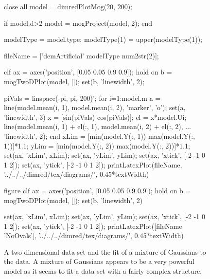 % 
\begin{figure}
  \begin{matlab}
    close all
    model = dimredPlotMog(20, 200);
    
    if model.d>2
      model = mogProject(model, 2);
    end
    
    modelType = model.type;
    modelType(1) = upper(modelType(1));


    fileName = ['demArtificial' modelType num2str(2)];
    
    clf
    ax = axes('position', [0.05 0.05 0.9 0.9]);
    hold on
    b = mogTwoDPlot(model, []);
    set(b, 'linewidth', 2);
    

    piVals = linspace(-pi, pi, 200)';
    for i=1:model.m
      a = line(model.mean(i, 1), model.mean(i, 2), 'marker', 'o');
      set(a, 'linewidth', 3)
      x = [sin(piVals) cos(piVals)];
      el = x*model.U{i};
      line(model.mean(i, 1) + el(:, 1), model.mean(i, 2) + el(:, 2), ...
      'linewidth', 2);
    end
    xLim = [min(model.Y(:, 1)) max(model.Y(:, 1))]*1.1;
    yLim = [min(model.Y(:, 2)) max(model.Y(:, 2))]*1.1;
    set(ax, 'xLim', xLim);
    set(ax, 'yLim', yLim);
    set(ax, 'xtick', [-2 -1 0 1 2]);
    set(ax, 'ytick', [-2 -1 0 1 2]);
    printLatexPlot(fileName, '../../../dimred/tex/diagrams/', 0.45*textWidth)
    
    figure
    clf
    ax = axes('position', [0.05 0.05 0.9 0.9]);
    hold on
    b = mogTwoDPlot(model, []);
    set(b, 'linewidth', 2)
    
    set(ax, 'xLim', xLim);
    set(ax, 'yLim', yLim);
    set(ax, 'xtick', [-2 -1 0 1 2]);
    set(ax, 'ytick', [-2 -1 0 1 2]);
    printLatexPlot([fileName 'NoOvals'], '../../../dimred/tex/diagrams/', 0.45*textWidth)
    
  \end{matlab}
  \begin{center}
    \hfill{}
  \end{center}
  
  \caption{A two dimensional data set and the fit of a mixture of
    Gaussians to the data. A mixture of Gaussians appears to be a very
    powerful model as it seems to fit a data set with a fairly complex
    structure.\label{fig:clusteredTwoDimensionalData} }
  
\end{figure}




